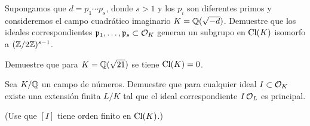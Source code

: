 \begin{ejercicio}
  Supongamos que $d = p_1\cdots p_s$, donde $s > 1$ y los $p_i$ son diferentes
  primos y consideremos el campo cuadrático imaginario $K = \mathbb{Q} (\sqrt{-d})$.
  Demuestre que los ideales correspondientes
  $\mathfrak{p}_1,\ldots,\mathfrak{p}_s \subset \mathcal{O}_K$ generan un subgrupo en
  $\operatorname{Cl} (K)$ isomorfo a $(\mathbb{Z}/2\mathbb{Z})^{s-1}$.
\end{ejercicio}

\begin{ejercicio}
  Demuestre que para $K = \mathbb{Q} (\sqrt{21})$ se tiene $\operatorname{Cl} (K) = 0$.
\end{ejercicio}

\begin{ejercicio}
  Sea $K/\mathbb{Q}$ un campo de números. Demuestre que para cualquier ideal
  $I \subset \mathcal{O}_K$ existe una extensión finita $L/K$ tal que el ideal
  correspondiente $I\,\mathcal{O}_L$ es principal.

  \noindent (Use que $[I]$ tiene orden finito en $\operatorname{Cl} (K)$.)
\end{ejercicio}
